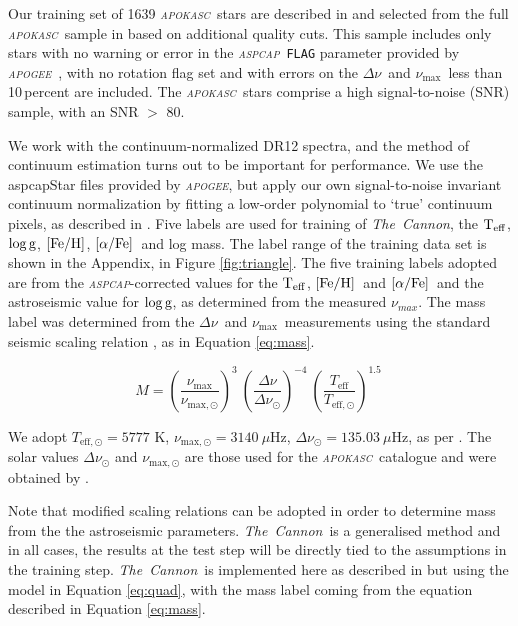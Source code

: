 \documentclass[12pt, preprint]{aastex}
\newcommand{\project}[1]{\textsl{#1}}
\newcommand{\tc}{\project{The~Cannon}}
\newcommand{\apogee}{\project{\textsc{apogee}}}
\newcommand{\apokasc}{\project{\textsc{apokasc}}}
\newcommand{\aspcap}{\project{\textsc{aspcap}}}
\newcommand{\code}[1]{\texttt{#1}}
\newcommand{\teff}{\mbox{$\rm T_{eff}$}}
\newcommand{\feh}{\mbox{$\rm [Fe/H]$}}
\newcommand{\alphafe}{\mbox{$\rm [\alpha/Fe]$}}
\newcommand{\logg}{\mbox{$\rm \log g$}}
\newcommand{\numax}{$\nu_{\max}$}
\newcommand{\deltanu}{$\Delta\nu$}
\begin{document}
Our training set of 1639 \apokasc\ stars are described in \citet{Martig2014} and selected from the full \apokasc\ sample in \citet{P2014} based on additional quality cuts. This sample includes only stars with no warning or error in the \aspcap\ \code{FLAG} parameter provided by \apogee\ \citep{Ahn2014}, with no rotation flag set and with errors on the \deltanu\ and \numax\ less than 10\,percent are included. The \apokasc\ stars comprise a high signal-to-noise (SNR) sample, with an SNR $>$ 80. 

We work with the continuum-normalized DR12 spectra, and the method of continuum
estimation turns out to be important for performance. We use the aspcapStar files provided by \apogee, but apply our own signal-to-noise invariant continuum normalization by fitting a low-order polynomial to `true' continuum pixels, as described in \citet{Ness2015}. 
%
Five labels are used for training of \tc, the \teff, \logg, \feh, \alphafe\ and log mass. The label range of the training data set is shown in the Appendix, in Figure \ref{fig:triangle}. 
 The five training labels adopted are from the \aspcap-corrected values  \citep{Meszaros2013} for the \teff, \feh\ and \alphafe\ and the astroseismic value for \logg, as determined from the measured $\nu_{max}$. The mass label was determined from the  \deltanu\ and \numax\ measurements using the standard seismic scaling relation \citep[e.g.][]{K1995}, as in Equation \ref{eq:mass}. 

\begin{equation} \label{eq:mass}
M= \left( \frac{\nu_{\mathrm{max}}}{\nu_{\mathrm{max,\odot}}}\right)^3\  \left( \frac{\Delta \nu}{\Delta \nu_{\odot}}\right)^{-4} \ \left( \frac{T_{\mathrm{eff}}}{T_{\mathrm{eff,\odot}}}\right)^{1.5} \ 
\end{equation}

We adopt  $T_{\mathrm{eff,\odot}}=5777$ K, $\nu_{\mathrm{max,\odot}}=3140\ \mu$Hz, $\Delta \nu_{\odot}=135.03\ \mu$Hz, as per \citet{Martig2014}. The solar values  $\Delta \nu_{\odot}$ and $\nu_{\mathrm{max,\odot}}$ are those used for the \apokasc\ catalogue and were obtained by \cite{Hekker2013}.

Note that modified scaling relations can be adopted in order to determine mass from the the astroseismic parameters. \tc\ is a generalised method and in all cases, the results at the test step will be directly tied to the assumptions in the training step. \tc\ is implemented here as described in \citet{Ness2015} but using the model in Equation \ref{eq:quad}, with the mass label coming from the equation described in Equation \ref{eq:mass}.  
\end{document}
